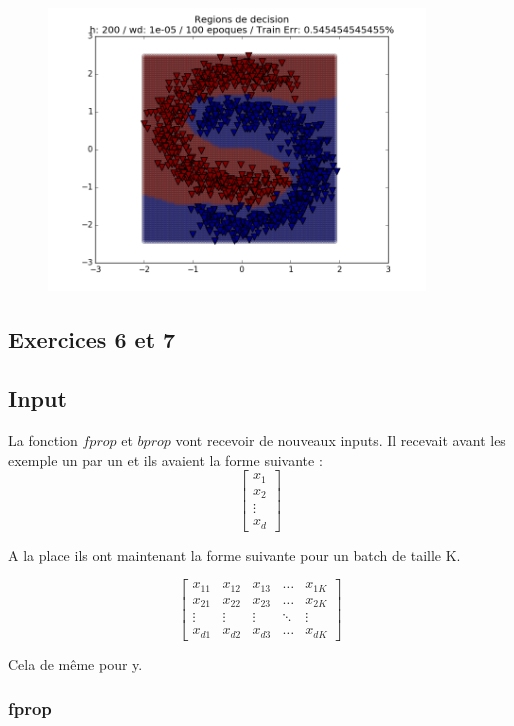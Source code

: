 \documentclass[a4paper,11pt]{article}
\begin{document}
\begin{figure}[H]
	\includegraphics[width=10cm]{images/exo5-under1.png}
	\centering
	\label{fig:comp}
\end{figure}



\subsection{Exercices 6 et 7	}
\subsection{Input}

La fonction $fprop$ et $bprop$ vont recevoir de nouveaux inputs.
Il recevait avant les exemple un par un et ils avaient la forme suivante :
\[
\begin{bmatrix}
    x_{1}  \\
    x_{2}  \\
    \vdots  \\
    x_{d} 
\end{bmatrix}
\]

A la place ils ont maintenant la forme suivante pour un batch de taille K. 

\[
\begin{bmatrix}
    x_{11} & x_{12} & x_{13} & \dots  & x_{1K} \\
    x_{21} & x_{22} & x_{23} & \dots  & x_{2K} \\
    \vdots & \vdots & \vdots & \ddots & \vdots \\
    x_{d1} & x_{d2} & x_{d3} & \dots  & x_{dK}
\end{bmatrix}
\]

Cela de même pour y.

\subsubsection{fprop}
\end{document}
